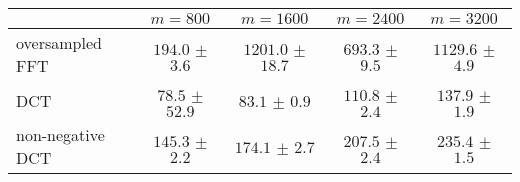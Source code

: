 \centering
\renewcommand{\arraystretch}{1.2}
\begin{tabular}{@{}lcccc@{}}
\toprule
 & $m=800$ & $m=1600$ & $m=2400$ & $m=3200$\\
\midrule
oversampled FFT & $194.0$ $\pm$ $3.6$ & $1201.0$ $\pm$ $18.7$ & $693.3$ $\pm$ $9.5$ & $1129.6$ $\pm$ $4.9$ \\
DCT & $78.5$ $\pm$ $52.9$ & $83.1$ $\pm$ $0.9$ & $110.8$ $\pm$ $2.4$ & $137.9$ $\pm$ $1.9$ \\
non-negative DCT & $145.3$ $\pm$ $2.2$ & $174.1$ $\pm$ $2.7$ & $207.5$ $\pm$ $2.4$ & $235.4$ $\pm$ $1.5$ \\
\bottomrule
\end{tabular}
